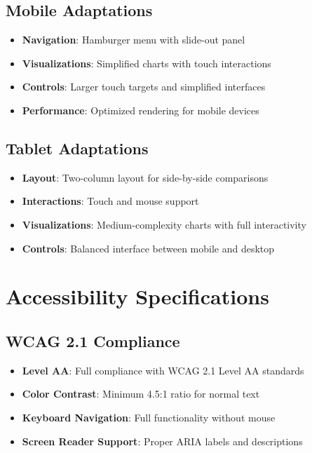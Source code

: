 \subsection{Mobile Adaptations}
\begin{itemize}
\item \textbf{Navigation}: Hamburger menu with slide-out panel
\item \textbf{Visualizations}: Simplified charts with touch interactions
\item \textbf{Controls}: Larger touch targets and simplified interfaces
\item \textbf{Performance}: Optimized rendering for mobile devices
\end{itemize}

\subsection{Tablet Adaptations}
\begin{itemize}
\item \textbf{Layout}: Two-column layout for side-by-side comparisons
\item \textbf{Interactions}: Touch and mouse support
\item \textbf{Visualizations}: Medium-complexity charts with full interactivity
\item \textbf{Controls}: Balanced interface between mobile and desktop
\end{itemize}


\section{Accessibility Specifications}

\subsection{WCAG 2.1 Compliance}
\begin{itemize}
\item \textbf{Level AA}: Full compliance with WCAG 2.1 Level AA standards
\item \textbf{Color Contrast}: Minimum 4.5:1 ratio for normal text
\item \textbf{Keyboard Navigation}: Full functionality without mouse
\item \textbf{Screen Reader Support}: Proper ARIA labels and descriptions
\end{itemize}

